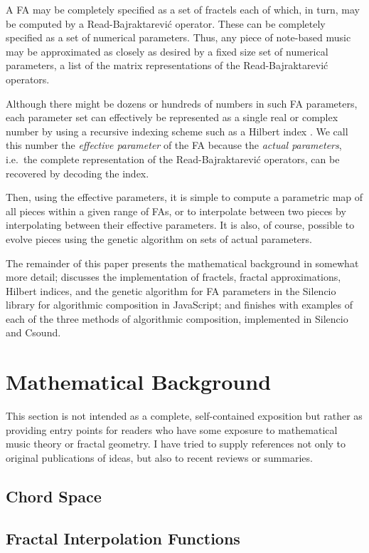 \documentclass[english,11pt,letterpaper,onecolumn]{scrartcl}
\begin{document}
A FA may be completely specified as a set of fractels each of which, 
in turn, may be computed by a Read-Bajraktarevi\'{c} operator. These can be 
completely specified as a set of numerical parameters. Thus, any piece of 
note-based music may be approximated as closely as desired by a fixed size set 
of numerical parameters, a list of the matrix representations of the 
Read-Bajraktarevi\'{c} operators.

Although there might be dozens or hundreds of numbers in such FA parameters, 
each parameter set can effectively be represented as a single real or complex 
number by using a recursive indexing scheme such as a Hilbert index 
\cite{hamilton2006compact}. We call this number the \textit{effective 
parameter} of the FA because the \textit{actual parameters}, i.e.\ the 
complete representation of the Read-Bajraktarevi\'{c} operators, can be 
recovered by decoding the index. 

Then, using the effective parameters, it is simple to compute a parametric map 
of all pieces within a given range of FAs, or to interpolate between two 
pieces by interpolating between their effective parameters. It is also, of 
course, possible to evolve pieces using the genetic algorithm on sets of 
actual parameters.

The remainder of this paper presents the mathematical background in 
somewhat more detail; discusses the implementation of fractels, fractal 
approximations, Hilbert indices, and the genetic algorithm for FA parameters 
in the Silencio library for algorithmic composition in JavaScript; and finishes 
with examples of each of the three methods of algorithmic composition, 
implemented in Silencio and Csound.

\section{Mathematical Background}

This section is not intended as a complete, self-contained exposition but 
rather as providing entry points for readers who have some exposure to 
mathematical music theory or fractal geometry. I have tried to supply 
references not only to original publications of ideas, but also to recent 
reviews or summaries.

\subsection{Chord Space}

\subsection{Fractal Interpolation Functions}
\end{document}
